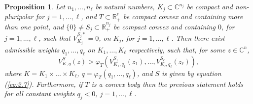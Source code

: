 \documentclass[a4paper,12pt,leqno,english]{article}
\numberwithin{equation}{section}
\newtheorem{proposition+}  [theorem+]  {Proposition}
\newenvironment{proposition}{\begin{proposition+}\sl}{\end{proposition+}\rm}
\begin{document}
\begin{proposition}
\label{weight:prop.1}
Let $n_1, \dots, n_\ell$ be natural numbers,
    $K_j \subset \mathbb{C}^{n_j}$ be compact and non-pluripolar for $j = 1, \dots, \ell$, and
    $T \subset \mathbb{R}_+^\ell$ be compact convex and containing more than one point, and
    $\{0\} \neq S_j \subset \mathbb{R}_+^{n_j}$ be compact convex and containing $0$, for $j = 1, \dots, \ell$,
        such that $V^{S_j*}_{K_j} = 0$, on $K_j$, for $j = 1, \dots, \ell$.
Then there exist admissible weights $q_1, \dots, q_\ell$ on $K_1, \dots, K_\ell$ respectively, such that, for some $z \in \mathbb{C}^n$, 
\begin{equation*}
    V^S_{K, q}(z)
    >
    \varphi_T(V^{S_1}_{K_1, q_1}(z_1), \dots, V^{S_\ell}_{K_\ell, q_\ell}(z_\ell)),
\end{equation*}
where
    $K = K_1 \times \dots \times K_\ell$,
    $q = \varphi_T(q_1, \dots, q_\ell)$, and 
    $S$ is given by equation (\ref{eq:2.7}).
Furthermore, if $T$ is a convex body then the previous statement holds for all constant weights $q_j < 0$, $j = 1, \dots, \ell$.
\end{proposition}
\end{document}
